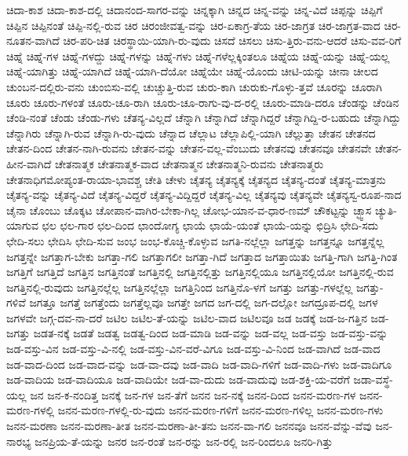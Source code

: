 {ಚಿದಾ-ಕಾಶ
ಚಿದಾ-ಕಾಶ-ದಲ್ಲಿ
ಚಿದಾನಂದ-ಸಾಗರ-ವನ್ನು
ಚಿನ್ನಕ್ಕಾಗಿ
ಚಿನ್ನದ
ಚಿನ್ನ-ವನ್ನು
ಚಿನ್ನ-ವಿದೆ
ಚಿಪ್ಪನ್ನು
ಚಿಪ್ಪಿಗೆ
ಚಿಪ್ಪಿನ
ಚಿಪ್ಪಿನಂತೆ
ಚಿಪ್ಪಿ-ನಲ್ಲಿ-ರುವ
ಚಿರ
ಚಿರಂಜೀವತ್ವ-ವನ್ನು
ಚಿರ-ಏಕಾಗ್ರ-ತೆಯ
ಚಿರ-ಜಾಗ್ರತ
ಚಿರ-ಜಾಗ್ರತ-ವಾದ
ಚಿರ-ನೂತನ-ವಾಗಿದೆ
ಚಿರ-ಪರಿ-ಚಿತ
ಚಿರಸ್ಥಾಯಿ-ಯಾಗಿ-ರು-ವುದು
ಚಿಸದೆ
ಚಿಸಲು
ಚಿಸು-ತ್ತಿರು-ವನು-ಆದರೆ
ಚಿಸು-ವವ-ರಿಗೆ
ಚಿಹ್ನೆ
ಚಿಹ್ನೆ-ಗಳ
ಚಿಹ್ನೆ-ಗಳದ್ದು
ಚಿಹ್ನೆ-ಗಳನ್ನು
ಚಿಹ್ನೆ-ಗಳು
ಚಿಹ್ನೆ-ಗಳೆಲ್ಲಕ್ಕಿಂತಲೂ
ಚಿಹ್ನೆಯ
ಚಿಹ್ನೆ-ಯನ್ನು
ಚಿಹ್ನೆ-ಯಲ್ಲ
ಚಿಹ್ನೆ-ಯಾಗಿತ್ತು
ಚಿಹ್ನೆ-ಯಾಗಿದೆ
ಚಿಹ್ನೆ-ಯಾಗಿ-ದೆಯೋ
ಚಿಹ್ನೆಯೇ
ಚಿಹ್ನೆ-ಯೊಂದು
ಚೀಟಿ-ಯನ್ನು
ಚೀನಾ
ಚೀಲದ
ಚುಂಬನ-ದಲ್ಲಿರು-ವನು
ಚುಂಬಿಸು-ವಲ್ಲಿ
ಚುಚ್ಚುತ್ತಿ-ರುವ
ಚುರು-ಕಾಗಿ
ಚುರುಕು-ಗೊಳ್ಳು-ತ್ತವೆ
ಚೂರನ್ನು
ಚೂರಾಗಿ
ಚೂರು
ಚೂರು-ಗಳಂತೆ
ಚೂರು-ಚೂ-ರಾಗಿ
ಚೂರು-ಚೂ-ರಾಗು-ವು-ದ-ರಲ್ಲಿ
ಚೂರು-ಮಾಡಿ-ದರೂ
ಚೆಂಡನ್ನು
ಚೆಂಡಿನ
ಚೆಂಡಿ-ನಂತೆ
ಚೆಂಡು
ಚೆಂಡು-ಗಳು
ಚೆತನ್ಯ-ವಿಲ್ಲದೆ
ಚೆನ್ನಾಗಿ
ಚೆನ್ನಾಗಿದೆ
ಚೆನ್ನಾಗಿದ್ದರೆ
ಚೆನ್ನಾಗಿದ್ದಿ-ರ-ಬಹುದು
ಚೆನ್ನಾಗಿದ್ದು
ಚೆನ್ನಾಗಿರು
ಚೆನ್ನಾಗಿ-ರುವ
ಚೆನ್ನಾಗಿ-ರು-ವುದು
ಚೆನ್ನಾದ
ಚೆಲ್ಲಾಟ
ಚೆಲ್ಲಾಪಿಲ್ಲಿ-ಯಾಗಿ
ಚೆಲ್ಲುತ್ತಾ
ಚೇತನ
ಚೇತನದ
ಚೇತನ-ದಿಂದ
ಚೇತನ-ನಾಗಿ-ರುವನು
ಚೇತನ-ವನ್ನು
ಚೇತನ-ವಲ್ಲ-ವೆಂಬುದು
ಚೇತನವು
ಚೇತನವೂ
ಚೇತನವೇ
ಚೇತನ-ಹೀನ-ವಾಗಿದೆ
ಚೇತನಾತ್ಮಕ
ಚೇತನಾತ್ಮಕ-ವಾದ
ಚೇತನಾತ್ಮನ
ಚೇತನಾತ್ಮನಿ-ರುವನು
ಚೇತನಾತ್ಮರು
ಚೇತನಾಧಿಗಮೋಪ್ಯಂತ-ರಾಯಾ-ಭಾವಶ್ಚ
ಚೇತಿ
ಚೇಳು
ಚೈತನ್ಯ
ಚೈತನ್ಯಕ್ಕೆ
ಚೈತನ್ಯದ
ಚೈತನ್ಯ-ದಂತೆ
ಚೈತನ್ಯ-ಮಾತ್ರನು
ಚೈತನ್ಯ-ವನ್ನು
ಚೈತನ್ಯ-ವಿದೆ
ಚೈತನ್ಯ-ವಿದ್ದರೆ
ಚೈತನ್ಯ-ವಿದ್ದಿದ್ದರೆ
ಚೈತನ್ಯ-ವಿಲ್ಲ
ಚೈತನ್ಯವು
ಚೈತನ್ಯವೇ
ಚೈತನ್ಯಸ್ವ-ರೂಪ-ನಾದ
ಚೈನಾ
ಚೊಂಬು
ಚೊಕ್ಕಟ
ಚೋಪಾನ-ವಾಗಿರ-ಬೇಕಾ-ಗಿಲ್ಲ
ಚೋಭ-ಯಾನ-ವ-ಧಾರ-ಣಮ್
ಚೌಕಟ್ಟನ್ನು
ಚ್ಛ್ವಾಸ
ಚ್ಯುತಿ-ಯಾಗುವ
ಛಲ
ಛಲ-ಗಾರ
ಛಲ-ದಿಂದ
ಛಾಂದೋಗ್ಯ
ಛಾಯೆ
ಛಾಯೆ-ಯಂತೆ
ಛಾಯೆ-ಯನ್ನು
ಛಿದ್ರಿಸಿ
ಛೇದಿ-ಸದು
ಛೇದಿ-ಸಲು
ಛೇದಿಸಿ
ಛೇದಿ-ಸುವ
ಜಂಭ
ಜಂಭ-ಕೊಚ್ಚಿ-ಕೊಳ್ಳುವ
ಜಗತಿ-ನಲ್ಲೆಲ್ಲಾ
ಜಗತ್ತನ್ನು
ಜಗತ್ತನ್ನೂ
ಜಗತ್ತನ್ನೆಲ್ಲ
ಜಗತ್ತನ್ನೇ
ಜಗತ್ತಾಗ-ಬೇಕು
ಜಗತ್ತಾ-ಗಲಿ
ಜಗತ್ತಾಗಲೀ
ಜಗತ್ತಾ-ಗಿದೆ
ಜಗತ್ತಾದ
ಜಗತ್ತಾಯಿತು
ಜಗತ್ತಿ-ಗಾಗಿ
ಜಗತ್ತಿ-ಗಿಂತ
ಜಗತ್ತಿಗೆ
ಜಗತ್ತಿದೆ
ಜಗತ್ತಿನ
ಜಗತ್ತಿನಂತೆ
ಜಗತ್ತಿನಲ್ಲಿ
ಜಗತ್ತಿನಲ್ಲಿತ್ತು
ಜಗತ್ತಿನಲ್ಲಿಯೂ
ಜಗತ್ತಿನಲ್ಲಿಯೋ
ಜಗತ್ತಿನಲ್ಲಿ-ರುವ
ಜಗತ್ತಿನಲ್ಲಿ-ರುವುದು
ಜಗತ್ತಿನಲ್ಲೆಲ್ಲ
ಜಗತ್ತಿನಲ್ಲೆಲ್ಲಾ
ಜಗತ್ತಿನಿಂದ
ಜಗತ್ತಿನೊ-ಳಗೆ
ಜಗತ್ತು
ಜಗತ್ತು-ಗಳಲ್ಲೆಲ್ಲ
ಜಗತ್ತು-ಗಳಿವೆ
ಜಗತ್ತೂ
ಜಗತ್ತೆ
ಜಗತ್ತೆಂದು
ಜಗತ್ತೆಲ್ಲವೂ
ಜಗತ್ತೇ
ಜಗದ
ಜಗ-ದಲ್ಲಿ
ಜಗ-ದಲ್ಲೋ
ಜಗದ್ರೂಪ-ದಲ್ಲಿ
ಜಗಳ
ಜಗಳವೇ
ಜಗ್ಗ-ದವ-ನಾ-ದರೆ
ಜಟಿಲ
ಜಟಿಲ-ತೆ-ಯನ್ನು
ಜಟಿಲ-ವಾದ
ಜಟಿಲವೂ
ಜಡ
ಜಡಕ್ಕೆ
ಜಡ-ಜ-ಗತ್ತಿನ
ಜಡ-ಜಗತ್ತು
ಜಡತ-ನಕ್ಕೆ
ಜಡತೆ
ಜಡತ್ವ
ಜಡತ್ವ-ದಿಂದ
ಜಡ-ಮಾಡಿ
ಜಡ-ವನ್ನು
ಜಡ-ವಲ್ಲ
ಜಡ-ವಸ್ತು
ಜಡ-ವಸ್ತು-ವನ್ನು
ಜಡ-ವಸ್ತು-ವಿನ
ಜಡ-ವಸ್ತು-ವಿ-ನಲ್ಲಿ
ಜಡ-ವಸ್ತು-ವಿನ-ವರೆ-ವಿಗೂ
ಜಡ-ವಸ್ತು-ವಿ-ನಿಂದ
ಜಡ-ವಾಗಿದೆ
ಜಡ-ವಾದ
ಜಡ-ವಾದ-ದಿಂದ
ಜಡ-ವಾದ-ವನ್ನು
ಜಡ-ವಾ-ದವು
ಜಡ-ವಾದಿ
ಜಡ-ವಾದಿ-ಗಳಿಗೆ
ಜಡ-ವಾದಿ-ಗಳು
ಜಡ-ವಾದಿಗೂ
ಜಡ-ವಾದಿಯ
ಜಡ-ವಾದಿಯೂ
ಜಡ-ವಾದಿಯೇ
ಜಡ-ವಾ-ದುದು
ಜಡ-ವಾದುವು
ಜಡ-ಶಕ್ತಿ-ಯ-ವರೆಗೆ
ಜಡಾ-ವಸ್ಥೆ-ಯಲ್ಲ
ಜನ
ಜನ-ಕ-ನಂದಿತ್ತ
ಜನಕ್ಕೆ
ಜನ-ಗಳ
ಜನ-ತೆಗೆ
ಜನನ
ಜನ-ನಕ್ಕೆ
ಜನನ-ದಿಂದ
ಜನನ-ಮರಣ-ಗಳ
ಜನನ-ಮರಣ-ಗಳಲ್ಲಿ
ಜನನ-ಮರಣ-ಗಳಲ್ಲಿ-ರು-ವುದು
ಜನನ-ಮರಣ-ಗಳಿಗೆ
ಜನನ-ಮರಣ-ಗಳಿಲ್ಲ
ಜನನ-ಮರಣ-ಗಳು
ಜನನ-ಮರಣಾ
ಜನನ-ಮರಣಾ-ತೀತ
ಜನನ-ಮರಣಾ-ತೀ-ತನು
ಜನನ-ವಾ-ಗಲಿ
ಜನನವೂ
ಜನನ-ವೆನ್ನು-ವೆವು
ಜನ-ನಾರಭ್ಯ
ಜನಪ್ರಿಯ-ತೆ-ಯನ್ನು
ಜನರ
ಜನ-ರಂತೆ
ಜನ-ರನ್ನು
ಜನ-ರಲ್ಲಿ
ಜನ-ರಿಂದಲೂ
ಜನರಿ-ಗಿತ್ತು
}
